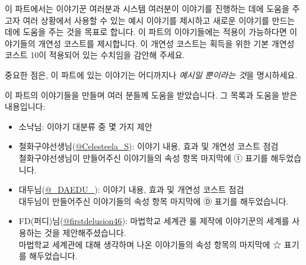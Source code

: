 \documentclass{report}
\begin{document}
	이 파트에서는 이야기꾼 여러분과 시스템 여러분이 이야기를 진행하는 데에 도움을 주고자 여러 상황에서 사용할 수 있는 예시 이야기를 제시하고 새로운 이야기를 만드는 데에 도움을 주는 것을 목표로 합니다. 이 파트의 이야기들에는 적용이 가능하다면 이야기들의 개연성 코스트를 제시합니다. 이 개연성 코스트는 획득을 위한 기본 개연성 코스트 10이 적용되어 있는 수치임을 감안해 주세요.
	
	중요한 점은, 이 파트에 있는 이야기는 어디까지나 \emph{예시일 뿐이라는 것}을 명시하세요.
	
	이 파트의 이야기들을 만들며 여러 분들께 도움을 받았습니다. 그 목록과 도움을 받은 내용입니다:
	\begin{itemize}
		\item 소낙님: 이야기 대분류 중 몇 가지 제안
		
		\item 철화구야선생님(\href{https://twitter.com/Celesteela_S}{@Celesteela\_S}): 이야기 내용, 효과 및 개연성 코스트 점검\\
		철화구야선생님이 만들어주신 이야기들의 속성 항목 마지막에 ⓣ 표기를 해두었습니다.
		
		\item 대두님(\href{https://twitter.com/_DAEDU_}{@\_DAEDU\_}): 이야기 내용, 효과 및 개연성 코스트 점검\\
		대두님이 만들어주신 이야기들의 속성 항목 마지막에 Ⓓ  표기를 해두었습니다.
		
		\item FD(퍼디)님(\href{https://twitter.com/firstdelusion46}{@firstdelusion46}): 마법학교 세계관 룰 제작에 이야기꾼의 세계를 사용하는 것을 제안해주셨습니다.\\
		마법학교 세계관에 대해 생각하며 나온 이야기들의 속성 항목의 마지막에 ☆ 표기를 해두었습니다.
	\end{itemize}
\end{document}
